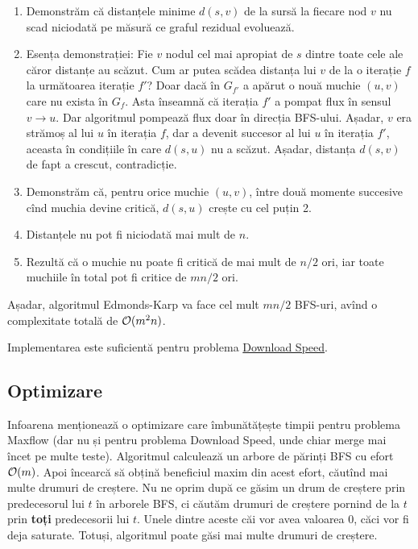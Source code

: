 \documentclass[../main.tex]{subfiles}
\begin{document}
\begin{enumerate}
  \item Demonstrăm că distanțele minime $d(s, v)$ de la sursă la fiecare nod $v$ nu scad niciodată pe măsură ce graful rezidual evoluează.

  \item Esența demonstrației: Fie $v$ nodul cel mai apropiat de $s$ dintre toate cele ale căror distanțe au scăzut. Cum ar putea scădea distanța lui $v$ de la o iterație $f$ la următoarea iterație $f'$? Doar dacă în $G_{f'}$ a apărut o nouă muchie $(u, v)$ care nu exista în $G_f$. Asta înseamnă că iterația $f'$ a pompat flux în sensul $v \to u$. Dar algoritmul pompează flux doar în direcția BFS-ului. Așadar, $v$ era strămoș al lui $u$ în iterația $f$, dar a devenit succesor al lui $u$ în iterația $f'$, aceasta în condițiile în care $d(s, u)$ nu a scăzut. Așadar, distanța $d(s, v)$ de fapt a crescut, contradicție.

  \item Demonstrăm că, pentru orice muchie $(u, v)$, între două momente succesive cînd muchia devine critică, $d(s, u)$ crește cu cel puțin 2.

  \item Distanțele nu pot fi niciodată mai mult de $n$.

  \item Rezultă că o muchie nu poate fi critică de mai mult de $n/2$ ori, iar toate muchiile în total pot fi critice de $mn/2$ ori.
\end{enumerate}

Așadar, algoritmul Edmonds-Karp va face cel mult $mn/2$ BFS-uri, avînd o complexitate totală de $\mathcal{O}(m^2n)$.

Implementarea este suficientă pentru problema \hyperref[problem:download-speed]{Download Speed}.

\subsection{Optimizare}

Infoarena menționează o optimizare care îmbunătățește timpii pentru problema Maxflow (dar nu și pentru problema Download Speed, unde chiar merge mai încet pe multe teste). Algoritmul calculează un arbore de părinți BFS cu efort $\mathcal{O}(m)$. Apoi încearcă să obțină beneficiul maxim din acest efort, căutînd mai multe drumuri de creștere. Nu ne oprim după ce găsim un drum de creștere prin predecesorul lui $t$ în arborele BFS, ci căutăm drumuri de creștere pornind de la $t$ prin \textbf{toți} predecesorii lui $t$. Unele dintre aceste căi vor avea valoarea 0, căci vor fi deja saturate. Totuși, algoritmul poate găsi mai multe drumuri de creștere.
\end{document}
